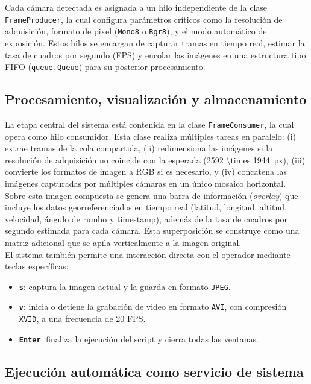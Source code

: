    Cada cámara detectada es asignada a un hilo independiente de la clase \texttt{FrameProducer}, la cual configura parámetros críticos como la resolución de adquisición, formato de pixel (\texttt{Mono8} o \texttt{Bgr8}), y el modo automático de exposición. Estos hilos se encargan de capturar tramas en tiempo real, estimar la tasa de cuadros por segundo (FPS) y encolar las imágenes en una estructura tipo FIFO (\texttt{queue.Queue}) para su posterior procesamiento.
  
  \subsection{Procesamiento, visualización y almacenamiento}
  
  La etapa central del sistema está contenida en la clase \texttt{FrameConsumer}, la cual opera como hilo consumidor. Esta clase realiza múltiples tareas en paralelo: (i) extrae tramas de la cola compartida, (ii) redimensiona las imágenes si la resolución de adquisición no coincide con la esperada (\SI[parse-numbers = false]{2592 \times 1944}{px}), (iii) convierte los formatos de imagen a RGB si es necesario, y (iv) concatena las imágenes capturadas por múltiples cámaras en un único mosaico horizontal.\\
  
  Sobre esta imagen compuesta se genera una barra de información (\textit{overlay}) que incluye los datos georreferenciados en tiempo real (latitud, longitud, altitud, velocidad, ángulo de rumbo y timestamp), además de la tasa de cuadros por segundo estimada para cada cámara. Esta superposición se construye como una matriz adicional que se apila verticalmente a la imagen original.\\
  
  El sistema también permite una interacción directa con el operador mediante teclas específicas:
  \begin{itemize}
      \item \textbf{\texttt{s}}: captura la imagen actual y la guarda en formato \texttt{JPEG}.
      \item \textbf{\texttt{v}}: inicia o detiene la grabación de video en formato \texttt{AVI}, con compresión \texttt{XVID}, a una frecuencia de 20 FPS.
      \item \textbf{\texttt{Enter}}: finaliza la ejecución del script y cierra todas las ventanas.
  \end{itemize}
  
  \subsection{Ejecución automática como servicio de sistema}
  
